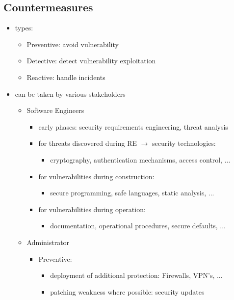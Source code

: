\documentclass[12pt,titlepage,a4paper]{report}
\begin{document}
			\subsection{Countermeasures}
				\begin{itemize}
					\item types:
					\begin{itemize}
						\item Preventive: avoid vulnerability
						\item Detective: detect vulnerability exploitation
						\item Reactive: handle incidents
					\end{itemize}
					\item can be taken by various stakeholders
					\begin{itemize}
						\item Software Engineers
						\begin{itemize}
							\item early phases: security requirements engineering, threat analysis
							\item for threats discovered during RE $\rightarrow$ security technologies:
							\begin{itemize}
								\item cryptography, authentication mechanisms, access control, ...
							\end{itemize}
							\item for vulnerabilities during construction:
							\begin{itemize}
								\item secure programming, safe languages, static analysis, ...
							\end{itemize}
							\item for vulnerabilities during operation:
							\begin{itemize}
								\item documentation, operational procedures, secure defaults, ...
							\end{itemize}
						\end{itemize}
						\item Administrator
						\begin{itemize}
							\item Preventive:
							\begin{itemize}
								\item deployment of additional protection: Firewalls, VPN's, ...
								\item patching weakness where possible: security updates

\end{itemize}
\end{itemize}
\end{itemize}
\end{itemize}
\end{document}
